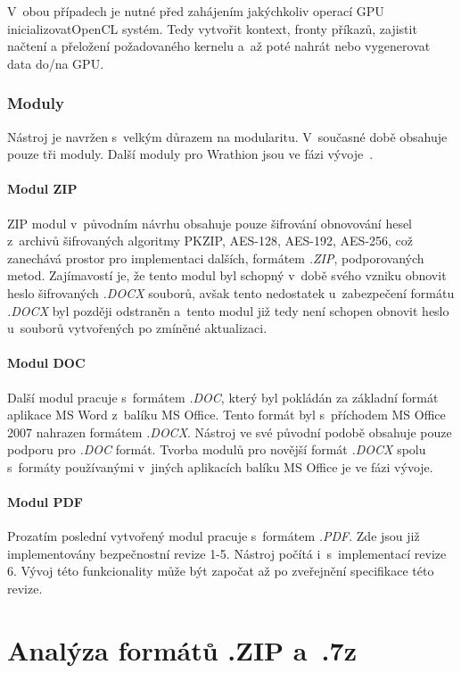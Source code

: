  V~obou případech je nutné před zahájením jakýchkoliv operací GPU
 inicializovat\linebreak OpenCL systém. Tedy vytvořit kontext, fronty příkazů, zajistit načtení a
 přeložení požadovaného kernelu a~až poté nahrát nebo vygenerovat data do/na GPU.

\subsection{Moduly}
Nástroj je navržen s~velkým důrazem na modularitu. V~současné době obsahuje pouze tři moduly.
Další moduly pro Wrathion jsou ve fázi vývoje~\cite{Hranicky}.

\subsubsection{Modul ZIP}
ZIP modul v~původním návrhu obsahuje pouze šifrování obnovování hesel z~archivů šifrovaných
algoritmy PKZIP, AES-128, AES-192, AES-256, což zanechává prostor pro implementaci dalších, formátem
{\it .ZIP}, podporovaných metod. Zajímavostí je, že tento modul byl schopný v~době svého vzniku
obnovit heslo šifrovaných {\it .DOCX} souborů, avšak tento nedostatek u~zabezpečení formátu {\it
.DOCX} byl později odstraněn a~tento modul již tedy není schopen obnovit heslo u~souborů vytvořených
po zmíněné aktualizaci.

\subsubsection{Modul DOC}
Další modul pracuje s~formátem {\it .DOC}, který byl pokládán za základní formát aplikace MS Word
z~balíku MS Office. Tento formát byl s~příchodem MS Office 2007 nahrazen formátem {\it .DOCX}.
Nástroj ve své původní podobě obsahuje pouze podporu pro {\it .DOC} formát. Tvorba modulů pro
novější formát {\it .DOCX} spolu s~formáty používanými v~jiných aplikacích balíku MS Office je ve
fázi vývoje.

\subsubsection{Modul PDF}
Prozatím poslední vytvořený modul pracuje s~formátem {\it .PDF}. Zde jsou již implementovány
bezpečnostní revize 1-5. Nástroj počítá i~s~implementací revize 6. Vývoj této funkcionality může
být započat až po zveřejnění specifikace této revize.


\chapter{Analýza formátů .ZIP a~.7z}
\label{ch:formaty}

